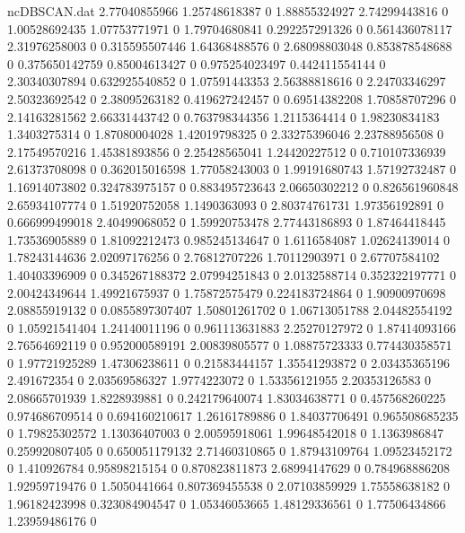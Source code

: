 \begin{filecontents}{ncDBSCAN.dat}
2.77040855966 1.25748618387 0
1.88855324927 2.74299443816 0
1.00528692435 1.07753771971 0
1.79704680841 0.292257291326 0
0.561436078117 2.31976258003 0
0.315595507446 1.64368488576 0
2.68098803048 0.853878548688 0
0.375650142759 0.85004613427 0
0.975254023497 0.442411554144 0
2.30340307894 0.632925540852 0
1.07591443353 2.56388818616 0
2.24703346297 2.50323692542 0
2.38095263182 0.419627242457 0
0.69514382208 1.70858707296 0
2.14163281562 2.66331443742 0
0.763798344356 1.2115364414 0
1.98230834183 1.3403275314 0
1.87080004028 1.42019798325 0
2.33275396046 2.23788956508 0
2.17549570216 1.45381893856 0
2.25428565041 1.24420227512 0
0.710107336939 2.61373708098 0
0.362015016598 1.77058243003 0
1.99191680743 1.57192732487 0
1.16914073802 0.324783975157 0
0.883495723643 2.06650302212 0
0.826561960848 2.65934107774 0
1.51920752058 1.1490363093 0
2.80374761731 1.97356192891 0
0.666999499018 2.40499068052 0
1.59920753478 2.77443186893 0
1.87464418445 1.73536905889 0
1.81092212473 0.985245134647 0
1.6116584087 1.02624139014 0
1.78243144636 2.02097176256 0
2.76812707226 1.70112903971 0
2.67707584102 1.40403396909 0
0.345267188372 2.07994251843 0
2.0132588714 0.352322197771 0
2.00424349644 1.49921675937 0
1.75872575479 0.224183724864 0
1.90900970698 2.08855919132 0
0.0855897307407 1.50801261702 0
1.06713051788 2.04482554192 0
1.05921541404 1.24140011196 0
0.961113631883 2.25270127972 0
1.87414093166 2.76564692119 0
0.952000589191 2.00839805577 0
1.08875723333 0.774430358571 0
1.97721925289 1.47306238611 0
0.21583444157 1.35541293872 0
2.03435365196 2.491672354 0
2.03569586327 1.9774223072 0
1.53356121955 2.20353126583 0
2.08665701939 1.8228939881 0
0.242179640074 1.83034638771 0
0.457568260225 0.974686709514 0
0.694160210617 1.26161789886 0
1.84037706491 0.965508685235 0
1.79825302572 1.13036407003 0
2.00595918061 1.99648542018 0
1.1363986847 0.259920807405 0
0.650051179132 2.71460310865 0
1.87943109764 1.09523452172 0
1.410926784 0.95898215154 0
0.870823811873 2.68994147629 0
0.784968886208 1.92959719476 0
1.5050441664 0.807369455538 0
2.07103859929 1.75558638182 0
1.96182423998 0.323084904547 0
1.05346053665 1.48129336561 0
1.77506434866 1.23959486176 0
\end{filecontents}
